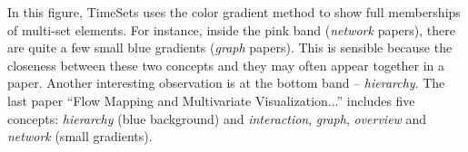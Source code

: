 In this figure, TimeSets uses the color gradient method to show full memberships of multi-set elements. For instance, inside the pink band (\textit{network} papers), there are quite a few small blue gradients (\textit{graph} papers). This is sensible because the closeness between these two concepts and they may often appear together in a paper. Another interesting observation is at the bottom band -- \textit{hierarchy}. The last paper ``Flow Mapping and Multivariate Visualization...'' includes five concepts: \textit{hierarchy} (blue background) and \textit{interaction}, \textit{graph}, \textit{overview} and \textit{network} (small gradients).